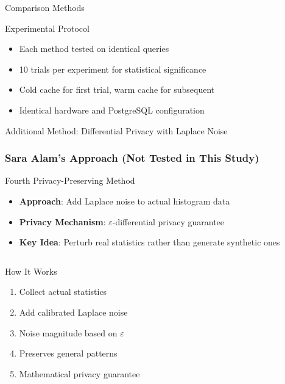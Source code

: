 \documentclass[smaller]{beamer}
\begin{document}
\begin{frame}{Comparison Methods}
\begin{alertblock}{Experimental Protocol}
\begin{itemize}
    \item Each method tested on identical queries
    \item 10 trials per experiment for statistical significance
    \item Cold cache for first trial, warm cache for subsequent
    \item Identical hardware and PostgreSQL configuration
\end{itemize}
\end{alertblock}

\end{frame}

\begin{frame}{Additional Method: Differential Privacy with Laplace Noise}
\frametitle{Sara Alam's Approach (Not Tested in This Study)}

\begin{block}{Fourth Privacy-Preserving Method}
\begin{itemize}
    \item \textbf{Approach}: Add Laplace noise to actual histogram data
    \item \textbf{Privacy Mechanism}: $\varepsilon$-differential privacy guarantee
    \item \textbf{Key Idea}: Perturb real statistics rather than generate synthetic ones
\end{itemize}
\end{block}

\begin{columns}[T]
\begin{column}{0.5\textwidth}
\begin{exampleblock}{How It Works}
\begin{enumerate}
    \item Collect actual statistics
    \item Add calibrated Laplace noise
    \item Noise magnitude based on $\varepsilon$
    \item Preserves general patterns
    \item Mathematical privacy guarantee
\end{enumerate}
\end{exampleblock}
\end{column}


\end{columns}
\end{frame}
\end{document}
